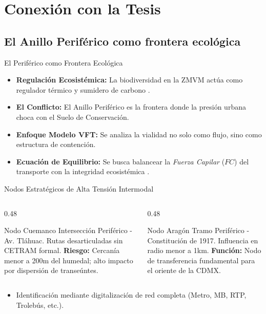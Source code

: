 \section{Conexión con la Tesis}
\subsection{El Anillo Periférico como frontera ecológica}

\begin{frame}{El Periférico como Frontera Ecológica}
  \begin{itemize}
    \item \textbf{Regulación Ecosistémica:} La biodiversidad en la ZMVM actúa como regulador térmico y sumidero de carbono \cite{sedema2022programa}.
    \item \textbf{El Conflicto:} El Anillo Periférico es la frontera donde la presión urbana choca con el Suelo de Conservación.
    \item \textbf{Enfoque Modelo VFT:} Se analiza la vialidad no solo como flujo, sino como estructura de contención.
    \item \textbf{Ecuación de Equilibrio:} Se busca balancear la \textit{Fuerza Capilar} ($FC$) del transporte con la integridad ecosistémica \cite{garibaldi2023vft}.
  \end{itemize}
\end{frame}

\begin{frame}{Nodos Estratégicos de Alta Tensión Intermodal}
  \begin{columns}[T]
    \begin{column}{0.48\textwidth}
      \begin{block}{Nodo Cuemanco}
        \scriptsize
        Intersección Periférico - Av. Tláhuac. Rutas desarticuladas sin CETRAM formal. 
        \textbf{Riesgo:} Cercanía menor a 200m del humedal; alto impacto por dispersión de transeúntes.
      \end{block}
    \end{column}
    \begin{column}{0.48\textwidth}
      \begin{block}{Nodo Aragón}
        \scriptsize
        Tramo Periférico - Constitución de 1917. Influencia en radio menor a 1km. 
        \textbf{Función:} Nodo de transferencia fundamental para el oriente de la CDMX.
      \end{block}
    \end{column}
  \end{columns}
  \vspace{0.3cm}
  \begin{itemize}
    \item Identificación mediante digitalización de red completa (Metro, MB, RTP, Trolebús, etc.).
  \end{itemize}
\end{frame}

